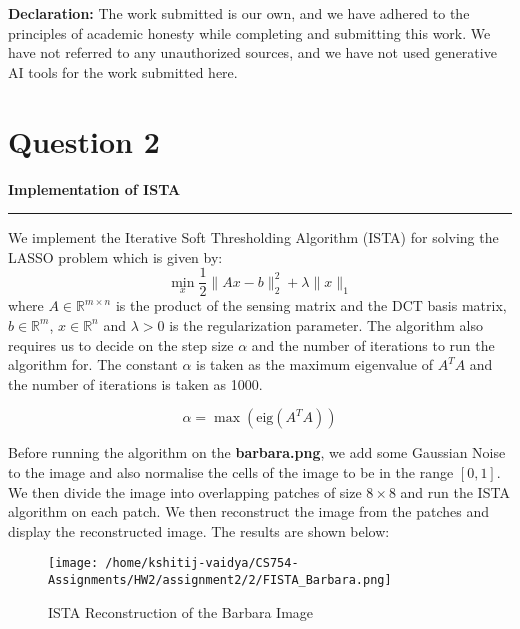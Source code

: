 \documentclass[a4paper,12pt]{article}
\title{\cooltitle{CS754 Assignment-2}}
\author{{\bf Saksham Rathi, Ekansh Ravi Shankar, Kshitij Vaidya}}
\date{}
\newenvironment{solution}[2][]{%
    \begin{mdframed}[linecolor=blue!70!black, linewidth=2pt, roundcorner=10pt, backgroundcolor=yellow!10!white, skipabove=12pt, skipbelow=12pt]%
        \textbf{\large #2}
        \par\noindent\rule{\textwidth}{0.4pt}
}{
    \end{mdframed}
}
\begin{document}
\maketitle
\textbf{Declaration:} The work submitted is our own, and
we have adhered to the principles of academic honesty while completing and submitting this work. We have not referred to any unauthorized sources, and we have not used generative AI tools for the work submitted here.

\section*{Question 2}

\begin{solution}{Implementation of ISTA}
  We implement the Iterative Soft Thresholding Algorithm (ISTA) for solving the LASSO problem which is given by:
  \begin{equation}
    \min_{x} \frac{1}{2} \|Ax - b\|_2^2 + \lambda \|x\|_1
  \end{equation}
  \noindent where $A \in \mathbb{R}^{m \times n}$ is the product of the sensing matrix and the DCT basis matrix, $b \in \mathbb{R}^m$, $x \in \mathbb{R}^n$ and $\lambda > 0$ is the regularization parameter. The algorithm also requires us to decide on the step size $\alpha$ and the number of iterations to run the algorithm for. The constant $\alpha$ is taken as the maximum eigenvalue of $A^TA$ and the number of iterations is taken as 1000. 

  \begin{equation}
    \alpha = \max(\text{eig}(A^TA))
  \end{equation}

  \noindent Before running the algorithm on the \textbf{barbara.png}, we add some Gaussian Noise to the image and also normalise the cells of the image to be in the range $[0, 1]$. We then divide the image into overlapping patches of size $8 \times 8$ and run the ISTA algorithm on each patch. We then reconstruct the image from the patches and display the reconstructed image. The results are shown below:

\end{solution}

\begin{figure}[!htbp]
  \centering
  \texttt{[image: /home/kshitij-vaidya/CS754-Assignments/HW2/assignment2/2/FISTA\_Barbara.png]}
  \caption{ISTA Reconstruction of the Barbara Image}
\end{figure}
\end{document}
